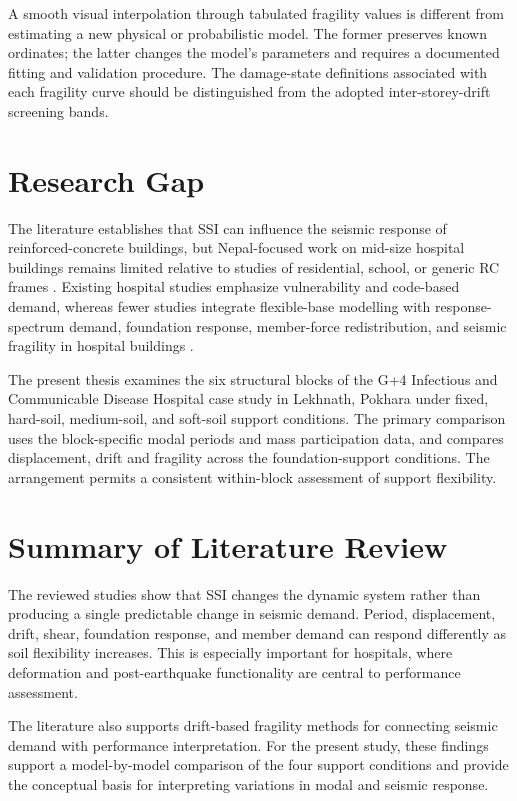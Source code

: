 A smooth visual interpolation through tabulated fragility values is different from estimating a new physical or probabilistic model. The former preserves known ordinates; the latter changes the model's parameters and requires a documented fitting and validation procedure. The damage-state definitions associated with each fragility curve should be distinguished from the adopted inter-storey-drift screening bands.

\section{Research Gap}
The literature establishes that SSI can influence the seismic response of reinforced-concrete buildings, but Nepal-focused work on mid-size hospital buildings remains limited relative to studies of residential, school, or generic RC frames \cite{adhikari2022,paudel2024seismic,giordano2021,yadav2023}. Existing hospital studies emphasize vulnerability and code-based demand, whereas fewer studies integrate flexible-base modelling with response-spectrum demand, foundation response, member-force redistribution, and seismic fragility in hospital buildings \cite{guragain2004,subedi2022}.

The present thesis examines the six structural blocks of the G+4 Infectious and Communicable Disease Hospital case study in Lekhnath, Pokhara under fixed, hard-soil, medium-soil, and soft-soil support conditions. The primary comparison uses the block-specific modal periods and mass participation data, and compares displacement, drift and fragility across the foundation-support conditions. The arrangement permits a consistent within-block assessment of support flexibility.

\section{Summary of Literature Review}
The reviewed studies show that SSI changes the dynamic system rather than producing a single predictable change in seismic demand. Period, displacement, drift, shear, foundation response, and member demand can respond differently as soil flexibility increases. This is especially important for hospitals, where deformation and post-earthquake functionality are central to performance assessment.

The literature also supports drift-based fragility methods for connecting seismic demand with performance interpretation. For the present study, these findings support a model-by-model comparison of the four support conditions and provide the conceptual basis for interpreting variations in modal and seismic response.
